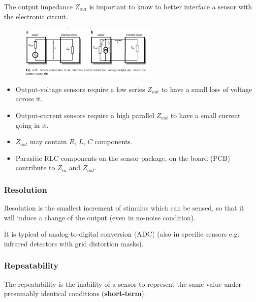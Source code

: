 The output impedance $Z_{out}$ is important to know to better interface a sensor with the electronic circuit.

   \begin{figure}[H]
    \centering
    \includegraphics[width = 0.6\textwidth]{L1/img/output-impedance.PNG}
\end{figure}

\begin{itemize}
\item Output-voltage sensors require a low series $Z_{out}$ to have a small loss of voltage across it.
 \item Output-current sensors require a high parallel $Z_{out}$ to have a small current going in it.
 \item $Z_{out}$ may contain $R$, $L$, $C$ components.
 \item Parasitic RLC components on the sensor package, on
the board (PCB) contribute to $Z_{in}$ and $Z_{out}$.
\end{itemize}

\subsubsection{Resolution}

\begin{mydef}
Resolution is the smallest increment of stimulus which can be
sensed, so that it will induce a change of the output (even in no-noise condition).
\end{mydef}

It is typical of analog-to-digital conversion (ADC) (also in specific sensors e.g. infrared detectors
with grid distortion masks).

\subsubsection{Repeatability}

\begin{mydef}
The repeatability is the inability of a sensor to represent the same value
under presumably identical conditions (\textbf{short-term}).
\end{mydef}

